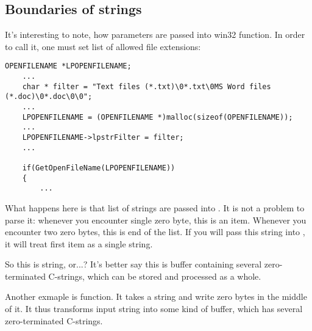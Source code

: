 \subsection{Boundaries of strings}

It's interesting to note, how parameters are passed into win32  function.
In order to call it, one must set list of allowed file extensions:

\begin{lstlisting}[style=customc]
	OPENFILENAME *LPOPENFILENAME;
	...
	char * filter = "Text files (*.txt)\0*.txt\0MS Word files (*.doc)\0*.doc\0\0";
	...
	LPOPENFILENAME = (OPENFILENAME *)malloc(sizeof(OPENFILENAME));
	...
	LPOPENFILENAME->lpstrFilter = filter;
	...

	if(GetOpenFileName(LPOPENFILENAME))
	{
		...
\end{lstlisting}

What happens here is that list of strings are passed into .
It is not a problem to parse it: whenever you encounter single zero byte, this is an item.
Whenever you encounter two zero bytes, this is end of the list.
If you will pass this string into \printf, it will treat first item as a single string.

So this is string, or...?
It's better say this is buffer containing several zero-terminated C-strings, which can be stored and processed
as a whole.

Another exmaple is  function. It takes a string and write zero bytes in the middle of it.
It thus transforms input string into some kind of buffer, which has several zero-terminated C-strings.

